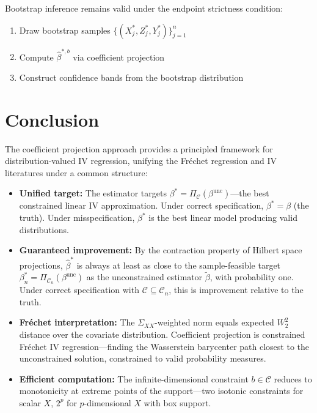 \documentclass[12pt]{article}
\begin{document}
Bootstrap inference remains valid under the endpoint strictness condition:
\begin{enumerate}
\item Draw bootstrap samples $\{(X_j^*, Z_j^*, Y_j^*)\}_{j=1}^n$
\item Compute $\hat{\beta}^{*,b}$ via coefficient projection
\item Construct confidence bands from the bootstrap distribution
\end{enumerate}

\section{Conclusion}

The coefficient projection approach provides a principled framework for distribution-valued IV regression, unifying the Fréchet regression and IV literatures under a common structure:

\begin{itemize}
\item \textbf{Unified target:} The estimator targets $\beta^* = \Pi_{\mathcal{C}}(\beta^{\text{unc}})$---the best constrained linear IV approximation. Under correct specification, $\beta^* = \beta$ (the truth). Under misspecification, $\beta^*$ is the best linear model producing valid distributions.

\item \textbf{Guaranteed improvement:} By the contraction property of Hilbert space projections, $\hat{\beta}^*$ is always at least as close to the sample-feasible target $\beta^*_n = \Pi_{\mathcal{C}_n}(\beta^{\text{unc}})$ as the unconstrained estimator $\tilde{\beta}$, with probability one. Under correct specification with $\mathcal{C} \subseteq \mathcal{C}_n$, this is improvement relative to the truth.

\item \textbf{Fréchet interpretation:} The $\Sigma_{XX}$-weighted norm equals expected $W_2^2$ distance over the covariate distribution. Coefficient projection is constrained Fréchet IV regression---finding the Wasserstein barycenter path closest to the unconstrained solution, constrained to valid probability measures.

\item \textbf{Efficient computation:} The infinite-dimensional constraint $b \in \mathcal{C}$ reduces to monotonicity at extreme points of the support---two isotonic constraints for scalar $X$, $2^p$ for $p$-dimensional $X$ with box support.
\end{itemize}
\end{document}
